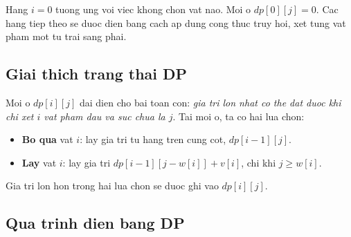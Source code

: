 Hang $i = 0$ tuong ung voi viec khong chon vat nao. Moi o $dp[0][j] = 0$.
Cac hang tiep theo se duoc dien bang cach ap dung cong thuc truy hoi,
xet tung vat pham mot tu trai sang phai.

\subsection{Giai thich trang thai DP}

Moi o $dp[i][j]$ dai dien cho bai toan con: \textit{gia tri lon nhat co the dat duoc
khi chi xet $i$ vat pham dau va suc chua la $j$}. Tai moi o, ta co hai lua chon:

\begin{itemize}
\item \textbf{Bo qua} vat $i$: lay gia tri tu hang tren cung cot, $dp[i-1][j]$.
\item \textbf{Lay} vat $i$: lay gia tri $dp[i-1][j - w[i]] + v[i]$, chi khi $j \geq w[i]$.
\end{itemize}

Gia tri lon hon trong hai lua chon se duoc ghi vao $dp[i][j]$.

\subsection{Qua trinh dien bang DP}

